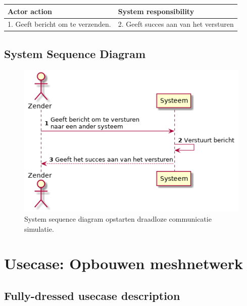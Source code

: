 \documentclass[a4paper, 11pt, oneside]{report}
\begin{document}
\begin{table}[H]
	\centering
	\begin{tabular}{|l|l|}
		\hline
		\rowcolor[HTML]{C0C0C0} 
		Actor action  & System responsibility   \\ \hline
		1. Geeft bericht om te verzenden. & 2. Geeft succes aan van het versturen  \\ \hline
	\end{tabular}
\end{table}


\subsection{System Sequence Diagram }
\label{Usecase:communicerendata:systemsequence}

\begin{figure}[H]
	\begin{center}\includegraphics[height=.2\textheight]{UML/out/usecase/sequence/VersturenBericht/VersturenBericht.png}\end{center}
	\caption{System sequence diagram opstarten draadloze communicatie simulatie.}
	\label{fig:communicerendata:systemsequence}
\end{figure}

\section[Opbouwen meshnetwerk]{Usecase: Opbouwen meshnetwerk}
\label{Usecase:opbouwenmeshnetwerk}
\subsection{Fully-dressed usecase description}
\end{document}
